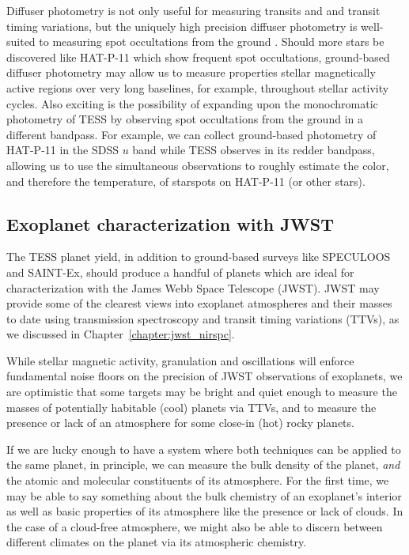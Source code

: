 Diffuser photometry is not only useful for measuring transits and and transit timing variations, but the uniquely high precision diffuser photometry is well-suited to measuring spot occultations from the ground \citep{Morris2018d}. Should more stars be discovered like HAT-P-11 which show frequent spot occultations, ground-based diffuser photometry may allow us to measure properties stellar magnetically active regions over very long baselines, for example, throughout stellar activity cycles. Also exciting is the possibility of expanding upon the monochromatic photometry of TESS by observing spot occultations from the ground in a different bandpass. For example, we can collect ground-based photometry of HAT-P-11 in the SDSS $u$ band while TESS observes in its redder bandpass, allowing us to use the simultaneous observations to roughly estimate the color, and therefore the temperature, of starspots on HAT-P-11 (or other stars). 

\subsection{Exoplanet characterization with JWST}

The TESS planet yield, in addition to ground-based surveys like SPECULOOS \citep{Delrez2018b} and SAINT-Ex, should produce a handful of planets which are ideal for characterization with the James Webb Space Telescope (JWST). JWST may provide some of the clearest views into exoplanet atmospheres and their masses to date using transmission spectroscopy and transit timing variations (TTVs), as we discussed in Chapter~\ref{chapter:jwst_nirspc}. 

While stellar magnetic activity, granulation and oscillations will enforce fundamental noise floors on the precision of JWST observations of exoplanets, we are optimistic that some targets may be bright and quiet enough to measure the masses of potentially habitable (cool) planets via TTVs, and to measure the presence or lack of an atmosphere for some close-in (hot) rocky planets. 

If we are lucky enough to have a system where both techniques can be applied to the same planet, in principle, we can measure the bulk density of the planet, {\it and} the atomic and molecular constituents of its atmosphere. For the first time, we may be able to say something about the bulk chemistry of an exoplanet's interior as well as basic properties of its atmosphere like the presence or lack of clouds. In the case of a cloud-free atmosphere, we might also be able to discern between different climates on the planet via its atmospheric chemistry. 

